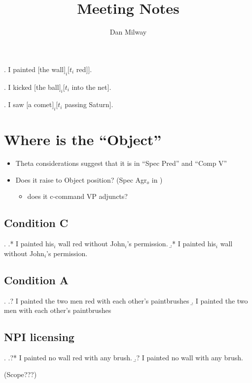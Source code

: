 \documentclass[letterpaper]{article}
\title{Meeting Notes}
\author{Dan Milway}
\begin{document}
\maketitle

\ex. I painted $[$the wall$]_i [ t_i$ red$]]$.

\ex. I kicked $[$the ball$]_i [ t_i$ into the net$]$.

\ex. I saw $[$a comet$]_i [ t_i$ passing Saturn$]$.

\section{Where is the ``Object''}
\begin{itemize}
  \item Theta considerations suggest that it is in ``Spec Pred'' and ``Comp V''
  \item Does it raise to Object position? (Spec Agr$_o$ in \textcite{lasnik1999minimalist})
    \begin{itemize}
      \item does it c-command VP adjuncts?
    \end{itemize}
\end{itemize}
\subsection{Condition C}
\ex.
\a.* I painted his$_i$ wall red without John$_i$'s permission.
\b.* I painted his$_i$ wall without John$_i$'s permission.

\subsection{Condition A}
\ex.
\a.? I painted the two men red with each other's paintbrushes
\b. I painted the two men with each other's paintbrushes

\subsection{NPI licensing}
\ex.
\a.?* I painted no wall red with any brush.
\b.? I painted no wall with any brush.

(Scope???)
\end{document}
